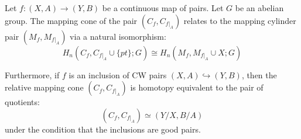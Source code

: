 \begin{proposition} \label{proposition:relative_mapping_cone_and_homology}
    \TODO{}
Let $f: (X, A) \to (Y, B)$ be a continuous map of pairs. Let $G$ be an abelian group. 
The mapping cone of the pair $(C_f, C_{f|_A})$ relates to the mapping cylinder pair $(M_f, M_{f|_A})$ via a natural isomorphism:
$$ H_n(C_f, C_{f|_A} \cup \{pt\}; G) \cong H_n(M_f, M_{f|_A} \cup X; G) $$

Furthermore, if $f$ is an inclusion of CW pairs $(X, A) \hookrightarrow (Y, B)$, then the relative mapping cone $(C_f, C_{f|_A})$ is homotopy equivalent to the pair of quotients:
$$ (C_f, C_{f|_A}) \simeq (Y/X, B/A) $$
under the condition that the inclusions are good pairs.
\end{proposition}